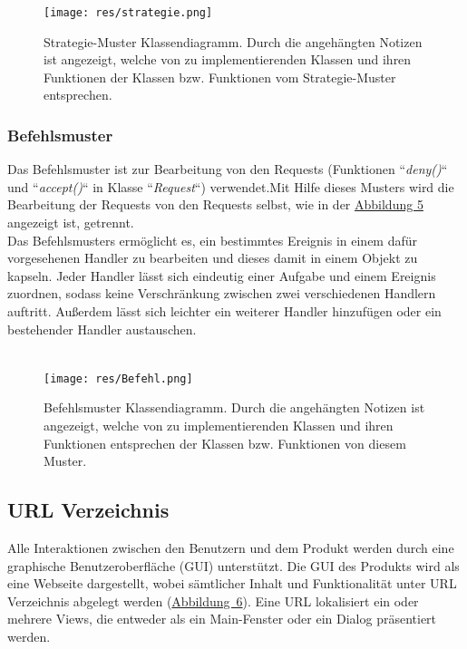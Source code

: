 \documentclass[parskip=full,11pt]{scrartcl}
\begin{document}
 \begin{figure}[ht!]
 	\centering
 	\texttt{[image: res/strategie.png]}
 	\caption{Strategie-Muster Klassendiagramm. Durch die angehängten Notizen ist angezeigt, welche von zu implementierenden Klassen und ihren Funktionen der Klassen bzw. Funktionen vom Strategie-Muster entsprechen. }
 \end{figure}
 
 \newpage
 \subsubsection*{Befehlsmuster}


Das Befehlsmuster ist zur Bearbeitung von den Requests (Funktionen ``\textit{deny()}`` und ``\textit{accept()}`` in Klasse ``\textit{Request}``) verwendet.Mit Hilfe dieses Musters wird die Bearbeitung der Requests von den Requests selbst, wie in der   \hyperref[Befehl]{Abbildung 5} angezeigt ist, getrennt.\\
 Das Befehlsmusters ermöglicht es, ein bestimmtes Ereignis in einem dafür vorgesehenen Handler
 zu bearbeiten und dieses damit in einem Objekt zu kapseln. Jeder Handler lässt sich eindeutig einer Aufgabe
 und einem Ereignis zuordnen, sodass keine Verschränkung zwischen zwei verschiedenen Handlern auftritt.
 Außerdem lässt sich leichter ein weiterer Handler hinzufügen oder ein bestehender Handler austauschen. \\\\
 
  \begin{figure}[ht!]
 	\centering
 	\texttt{[image: res/Befehl.png]}
 	\caption{Befehlsmuster Klassendiagramm. Durch die angehängten Notizen ist angezeigt, welche von zu implementierenden Klassen und ihren Funktionen entsprechen der Klassen bzw. Funktionen von diesem Muster.}
 	\label{Befehl}
 \end{figure}

\newpage
  \subsection{URL Verzeichnis}
Alle Interaktionen zwischen den Benutzern und dem Produkt werden durch eine graphische Benutzeroberfläche (GUI) unterstützt. Die \gls{GUI} des Produkts wird als eine Webseite dargestellt, wobei sämtlicher Inhalt und Funktionalität unter URL Verzeichnis abgelegt werden (\hyperref[URL Struktur]{\mbox{Abbildung 6}}). Eine URL lokalisiert ein oder mehrere Views, die entweder als ein Main-Fenster oder ein Dialog präsentiert werden.  
\end{document}
